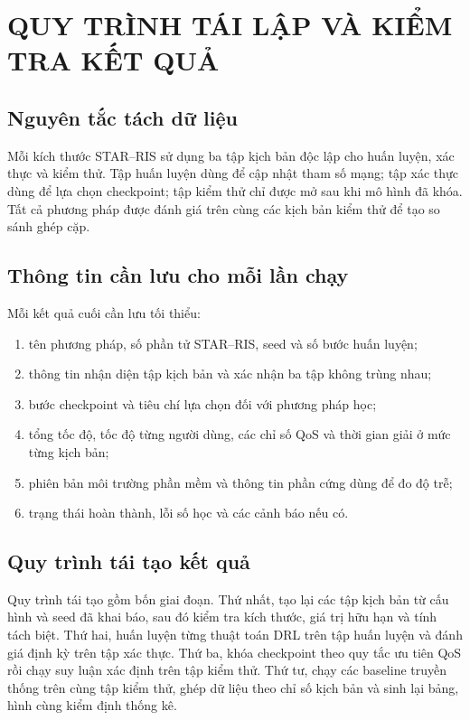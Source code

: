 \chapter{QUY TRÌNH TÁI LẬP VÀ KIỂM TRA KẾT QUẢ}
\label{app:reproducibility}

\section{Nguyên tắc tách dữ liệu}
Mỗi kích thước STAR--RIS sử dụng ba tập kịch bản độc lập cho huấn luyện, xác thực và kiểm thử. Tập huấn luyện dùng để cập nhật tham số mạng; tập xác thực dùng để lựa chọn checkpoint; tập kiểm thử chỉ được mở sau khi mô hình đã khóa. Tất cả phương pháp được đánh giá trên cùng các kịch bản kiểm thử để tạo so sánh ghép cặp.

\section{Thông tin cần lưu cho mỗi lần chạy}
Mỗi kết quả cuối cần lưu tối thiểu:
\begin{enumerate}[label=\arabic*)]
  \item tên phương pháp, số phần tử STAR--RIS, seed và số bước huấn luyện;
  \item thông tin nhận diện tập kịch bản và xác nhận ba tập không trùng nhau;
  \item bước checkpoint và tiêu chí lựa chọn đối với phương pháp học;
  \item tổng tốc độ, tốc độ từng người dùng, các chỉ số QoS và thời gian giải ở mức từng kịch bản;
  \item phiên bản môi trường phần mềm và thông tin phần cứng dùng để đo độ trễ;
  \item trạng thái hoàn thành, lỗi số học và các cảnh báo nếu có.
\end{enumerate}

\section{Quy trình tái tạo kết quả}
Quy trình tái tạo gồm bốn giai đoạn. Thứ nhất, tạo lại các tập kịch bản từ cấu hình và seed đã khai báo, sau đó kiểm tra kích thước, giá trị hữu hạn và tính tách biệt. Thứ hai, huấn luyện từng thuật toán DRL trên tập huấn luyện và đánh giá định kỳ trên tập xác thực. Thứ ba, khóa checkpoint theo quy tắc ưu tiên QoS rồi chạy suy luận xác định trên tập kiểm thử. Thứ tư, chạy các baseline truyền thống trên cùng tập kiểm thử, ghép dữ liệu theo chỉ số kịch bản và sinh lại bảng, hình cùng kiểm định thống kê.

